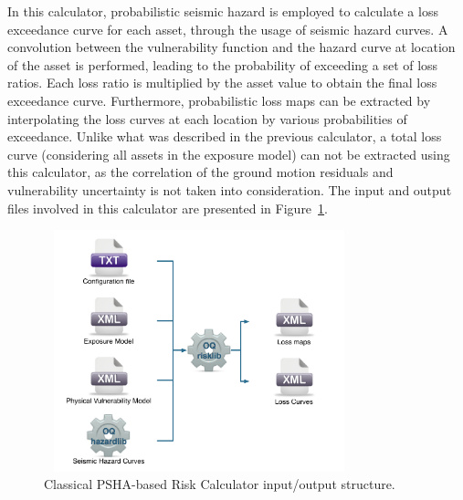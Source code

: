 In this calculator, probabilistic seismic hazard is employed to calculate a
loss exceedance curve for each asset, through the usage of seismic hazard
curves. A convolution between the vulnerability function and the hazard curve
at location of the asset is performed, leading to the probability of exceeding
a set of loss ratios. Each loss ratio is multiplied by the asset value to
obtain the final loss exceedance curve. Furthermore, probabilistic loss maps
can be extracted by interpolating the loss curves at each location by various
probabilities of exceedance. Unlike what was described in the previous
calculator, a total loss curve (considering all assets in the exposure model)
can not be extracted using this calculator, as the correlation of the ground
motion residuals and vulnerability uncertainty is not taken into
consideration. The input and output files involved in this calculator are
presented in Figure~\ref{fig:io-structure-classical-risk}.

\begin{figure}[ht]
\centering
\includegraphics[width=9cm,height=7cm]{figures/risk/io-structure-classical-risk.pdf}
\caption{Classical PSHA-based Risk Calculator input/output structure.}
\label{fig:io-structure-classical-risk}
\end{figure}